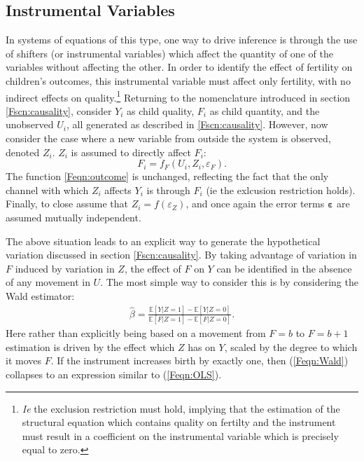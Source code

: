 \subsection{Instrumental Variables}
\label{Fsscn:kidIV}
In systems of equations of this type, one way to drive inference is through the
use of shifters (or instrumental variables) which affect the quantity of one of
the variables without affecting the other.  In order to identify the effect of 
fertility on children's outcomes, this instrumental variable must affect only 
fertility, with no indirect effects on quality.\footnote{\emph{Ie} the exclusion 
restriction must hold, implying that the estimation of the structural equation 
which contains quality on fertilty and the instrument must result in a 
coefficient on the instrumental variable which is precisely equal to zero.}
Returning to the nomenclature introduced in section \ref{Fscn:causality},
consider $Y_i$ as child quality, $F_i$ as child quantity, and the unobserved
$U_i$, all generated as described in \ref{Fscn:causality}.  However, now consider 
the case where a new variable from outside the system is observed, denoted 
$Z_i$.  $Z_i$ is assumed to directly affect $F_i$:
\[
F_i = f_F(U_i,Z_i,\varepsilon_F).
\]
The function \ref{Feqn:outcome} is unchanged, reflecting the fact that the only
channel with which $Z_i$ affects $Y_i$ is through $F_i$ (ie the exlcusion 
restriction holds).  Finally, to close assume that $Z_i=f(\varepsilon_Z)$,
and once again the error terms $\bm{\varepsilon}$ are assumed mutually 
independent.

The above situation leads to an explicit way to generate the hypothetical 
variation discussed in section \ref{Fscn:causality}.  By taking advantage of 
variation in $F$ induced by variation in $Z$, the effect of $F$ on $Y$ can
be identified in the absence of any movement in $U$.  The most simple way to
consider this is by considering the Wald estimator:
\begin{eqnarray}
\label{Feqn:Wald}
\hat\beta = \frac{\mathbb{E}[Y|Z=1]-\mathbb{E}[Y|Z=0]}{\mathbb{E}[F|Z=1]-\mathbb{E}[F|Z=0]}.
\end{eqnarray}
Here rather than explicitly being based on a movement from $F=b$ to $F=b+1$
estimation is driven by the effect which $Z$ has on $Y$, scaled by the
degree to which it moves $F$.  If the instrument increases birth by exactly
one, then (\ref{Feqn:Wald}) collapses to an expression similar to 
(\ref{Feqn:OLS}).

